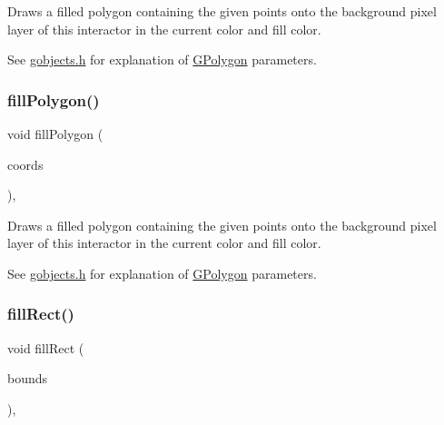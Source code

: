 Draws a filled polygon containing the given points onto the background pixel layer of this interactor in the current color and fill color. 

See \mbox{\hyperlink{gobjects_8h_source}{gobjects.\+h}} for explanation of \mbox{\hyperlink{classGPolygon}{G\+Polygon}} parameters. \mbox{\label{classGDrawingSurface_a31822d59786156ebf1cc3b2f7fb70330}} 
\subsubsection{\texorpdfstring{fill\+Polygon()}{fillPolygon()}\hspace{0.1cm}{\footnotesize\ttfamily [2/2]}}
{\footnotesize\ttfamily void fill\+Polygon (\begin{DoxyParamCaption}\item[{std\+::initializer\+\_\+list$<$ \mbox{\hyperlink{structGPoint}{G\+Point}} $>$}]{coords }\end{DoxyParamCaption})\hspace{0.3cm}{\ttfamily [virtual]}, {\ttfamily [inherited]}}



Draws a filled polygon containing the given points onto the background pixel layer of this interactor in the current color and fill color. 

See \mbox{\hyperlink{gobjects_8h_source}{gobjects.\+h}} for explanation of \mbox{\hyperlink{classGPolygon}{G\+Polygon}} parameters. \mbox{\label{classGDrawingSurface_ae6582295003bf2488836b1993dadbad7}} 
\subsubsection{\texorpdfstring{fill\+Rect()}{fillRect()}\hspace{0.1cm}{\footnotesize\ttfamily [1/2]}}
{\footnotesize\ttfamily void fill\+Rect (\begin{DoxyParamCaption}\item[{const \mbox{\hyperlink{structGRectangle}{G\+Rectangle}} \&}]{bounds }\end{DoxyParamCaption})\hspace{0.3cm}{\ttfamily [virtual]}, {\ttfamily [inherited]}}



